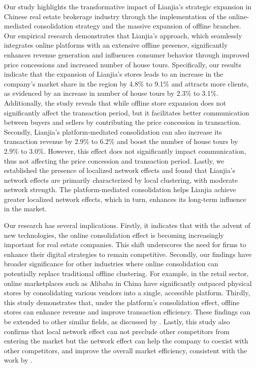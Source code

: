 \documentclass[11pt]{article}
\begin{document}
Our study highlights the transformative impact of Lianjia's strategic expansion in Chinese real estate brokerage industry through the implementation of the online-mediated consolidation strategy and the massive expansion of offline branches. Our empirical research demonstrates that Lianjia's approach, which seamlessly integrates online platforms with an extensive offline presence, significantly enhances revenue generation and influences consumer behavior through improved price concessions and increased number of house tours. Specifically, our results indicate that the expansion of Lianjia's stores leads to an increase in the company's market share in the region by 4.8\% to 9.1\% and attracts more clients, as evidenced by an increase in number of house tours by 2.3\% to 3.1\%. Additionally, the study reveals that while offline store expansion does not significantly affect the transaction period, but it facilitates better communication between buyers and sellers by contributing the price concession in transaction. Secondly, Lianjia's platform-mediated consolidation can also increase its transaction revenue by 2.9\% to 6.2\% and boost the number of house tours by 2.9\% to 3.0\%. However, this effect does not significantly impact communication, thus not affecting the price concession and transaction period. Lastly, we established the presence of localized network effects and found that Lianjia's network effects are primarily characterized by local clustering, with moderate network strength. The platform-mediated consolidation helps Lianjia achieve greater localized network effects, which in turn, enhances its long-term influence in the market.

Our research has several implications. Firstly, it indicates that with the advent of new technologies, the online consolidation effect is becoming increasingly important for real estate companies. This shift underscores the need for firms to enhance their digital strategies to remain competitive. Secondly, our findings have broader significance for other industries where online consolidation can potentially replace traditional offline clustering. For example, in the retail sector, online marketplaces such as Alibaba in China have significantly outpaced physical stores by consolidating various vendors into a single, accessible platform. Thirdly, this study demonstrates that, under the platform's consolidation effect, offline stores can enhance revenue and improve transaction efficiency. These findings can be extended to other similar fields, as discussed by \citep{10.1257/jep.28.2.3}. Lastly, this study also confirms that local network effect can not preclude other competitors from entering the market but the network effect can help the company to coexist with other competitors, and improve the overall market efficiency, consistent with the work by \citep{gilbukh_goldsmith-pinkham_2019}.
\end{document}
